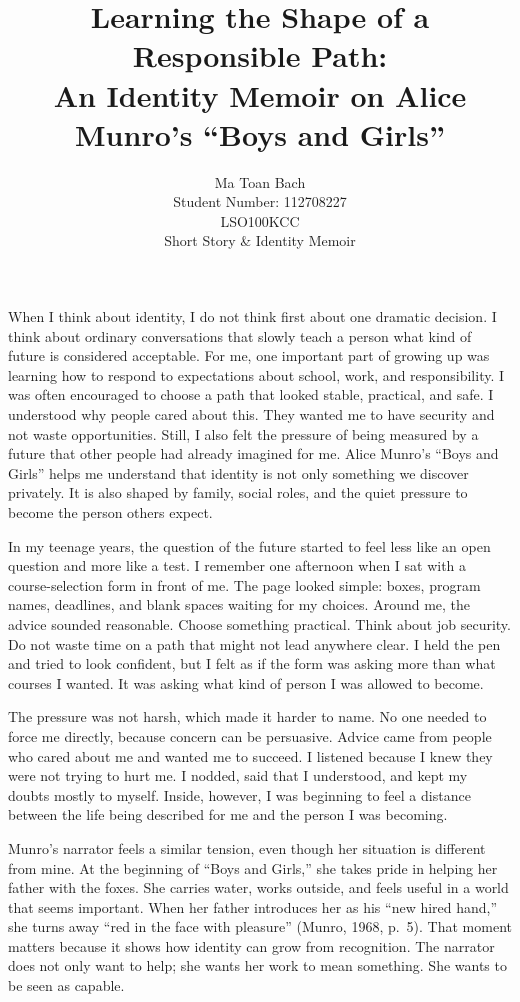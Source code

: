\documentclass[12pt]{article}
\title{Learning the Shape of a Responsible Path:\\
An Identity Memoir on Alice Munro's ``Boys and Girls''}
\author{%
  Ma Toan Bach\\
  Student Number: 112708227\\
  LSO100KCC\\
  Short Story \& Identity Memoir
}
\date{}
\begin{document}
\maketitle

When I think about identity, I do not think first about one dramatic decision. I think about ordinary conversations that slowly teach a person what kind of future is considered acceptable. For me, one important part of growing up was learning how to respond to expectations about school, work, and responsibility. I was often encouraged to choose a path that looked stable, practical, and safe. I understood why people cared about this. They wanted me to have security and not waste opportunities. Still, I also felt the pressure of being measured by a future that other people had already imagined for me. Alice Munro's ``Boys and Girls'' helps me understand that identity is not only something we discover privately. It is also shaped by family, social roles, and the quiet pressure to become the person others expect.

In my teenage years, the question of the future started to feel less like an open question and more like a test. I remember one afternoon when I sat with a course-selection form in front of me. The page looked simple: boxes, program names, deadlines, and blank spaces waiting for my choices. Around me, the advice sounded reasonable. Choose something practical. Think about job security. Do not waste time on a path that might not lead anywhere clear. I held the pen and tried to look confident, but I felt as if the form was asking more than what courses I wanted. It was asking what kind of person I was allowed to become.

The pressure was not harsh, which made it harder to name. No one needed to force me directly, because concern can be persuasive. Advice came from people who cared about me and wanted me to succeed. I listened because I knew they were not trying to hurt me. I nodded, said that I understood, and kept my doubts mostly to myself. Inside, however, I was beginning to feel a distance between the life being described for me and the person I was becoming.

Munro's narrator feels a similar tension, even though her situation is different from mine. At the beginning of ``Boys and Girls,'' she takes pride in helping her father with the foxes. She carries water, works outside, and feels useful in a world that seems important. When her father introduces her as his ``new hired hand,'' she turns away ``red in the face with pleasure'' (Munro, 1968, p.~5). That moment matters because it shows how identity can grow from recognition. The narrator does not only want to help; she wants her work to mean something. She wants to be seen as capable.
\end{document}
